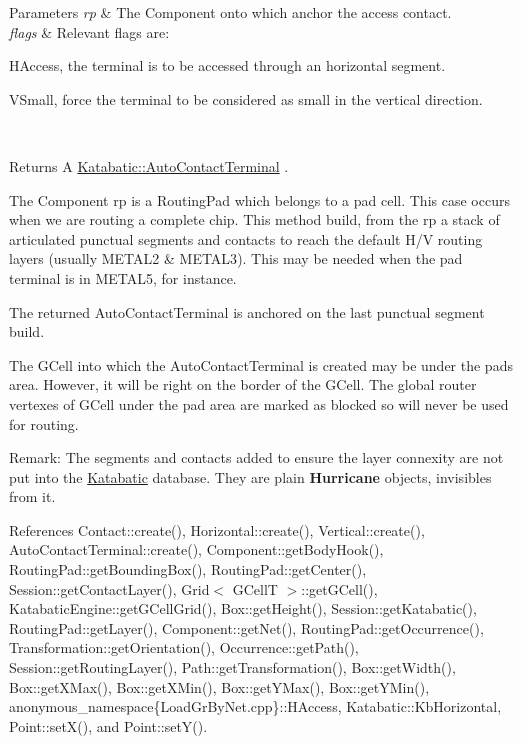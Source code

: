 \begin{DoxyParams}{Parameters}
{\em rp} & The Component onto which anchor the access contact. \\
\hline
{\em flags} & Relevant flags are\-:
\begin{DoxyItemize}
\item H\-Access, the terminal is to be accessed through an horizontal segment.
\item V\-Small, force the terminal to be considered as small in the vertical direction. 
\end{DoxyItemize}\\
\hline
\end{DoxyParams}
\begin{DoxyReturn}{Returns}
A \hyperlink{classKatabatic_1_1AutoContactTerminal}{Katabatic\-::\-Auto\-Contact\-Terminal} .
\end{DoxyReturn}
The Component {\ttfamily rp} is a Routing\-Pad which belongs to a pad cell. This case occurs when we are routing a complete chip. This method build, from the {\ttfamily rp} a stack of articulated punctual segments and contacts to reach the default H/\-V routing layers (usually {\ttfamily M\-E\-T\-A\-L2} \& {\ttfamily M\-E\-T\-A\-L3}). This may be needed when the pad terminal is in {\ttfamily M\-E\-T\-A\-L5}, for instance.

The returned Auto\-Contact\-Terminal is anchored on the last punctual segment build.

The G\-Cell into which the Auto\-Contact\-Terminal is created may be under the pads area. However, it will be right on the border of the G\-Cell. The global router vertexes of G\-Cell under the pad area are marked as blocked so will never be used for routing.

\begin{DoxyParagraph}{Remark\-:}
The segments and contacts added to ensure the layer connexity are not put into the \hyperlink{namespaceKatabatic}{Katabatic} database. They are plain {\bf Hurricane} objects, invisibles from it. 
\end{DoxyParagraph}


References Contact\-::create(), Horizontal\-::create(), Vertical\-::create(), Auto\-Contact\-Terminal\-::create(), Component\-::get\-Body\-Hook(), Routing\-Pad\-::get\-Bounding\-Box(), Routing\-Pad\-::get\-Center(), Session\-::get\-Contact\-Layer(), Grid$<$ G\-Cell\-T $>$\-::get\-G\-Cell(), Katabatic\-Engine\-::get\-G\-Cell\-Grid(), Box\-::get\-Height(), Session\-::get\-Katabatic(), Routing\-Pad\-::get\-Layer(), Component\-::get\-Net(), Routing\-Pad\-::get\-Occurrence(), Transformation\-::get\-Orientation(), Occurrence\-::get\-Path(), Session\-::get\-Routing\-Layer(), Path\-::get\-Transformation(), Box\-::get\-Width(), Box\-::get\-X\-Max(), Box\-::get\-X\-Min(), Box\-::get\-Y\-Max(), Box\-::get\-Y\-Min(), anonymous\-\_\-namespace\{\-Load\-Gr\-By\-Net.\-cpp\}\-::\-H\-Access, Katabatic\-::\-Kb\-Horizontal, Point\-::set\-X(), and Point\-::set\-Y().



